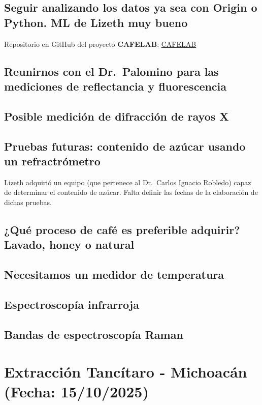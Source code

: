 \documentclass{article}
\begin{document}
\subsection{Seguir analizando los datos ya sea con Origin o Python. ML de Lizeth muy bueno}

Repositorio en GitHub del proyecto \textbf{CAFELAB}:  
\href{https://github.com/jazoro911/CafeLab}{CAFELAB}

\subsection{Reunirnos con el Dr.~Palomino para las mediciones de reflectancia y fluorescencia}

\subsection{Posible medición de difracción de rayos X}

\subsection{Pruebas futuras: contenido de azúcar usando un refractrómetro}

Lizeth adquirió un equipo (que pertenece al Dr.~Carlos Ignacio Robledo) capaz de determinar el contenido de azúcar.  
Falta definir las fechas de la elaboración de dichas pruebas.

\subsection{¿Qué proceso de café es preferible adquirir? Lavado, honey o natural}

\subsection{Necesitamos un medidor de temperatura}

\subsection{Espectroscopía infrarroja}

\subsection{Bandas de espectroscopía Raman}


\section{Extracción Tancítaro  - Michoacán (Fecha: 15/10/2025)}
\end{document}
